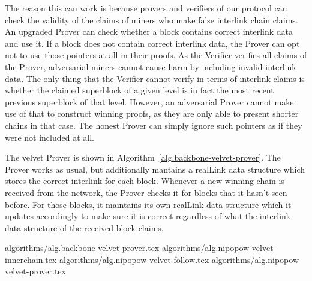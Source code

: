 The reason this can work is because provers and verifiers of our protocol can
check the validity of the claims of miners who make false interlink chain
claims. An upgraded Prover can check whether a block contains correct interlink
data and use it. If a block does not contain correct interlink data, the Prover
can opt not to use those pointers at all in their proofs. As the Verifier
verifies all claims of the Prover, adversarial miners cannot cause harm by
including invalid interlink data. The only thing that the Verifier cannot
verify in terms of interlink claims is whether the claimed superblock of a
given level is in fact the most recent previous superblock of that level.
However, an adversarial Prover cannot make use of that to construct winning
proofs, as they are only able to present shorter chains in that case. The
honest Prover can simply ignore such pointers as if they were not included at
all.

The velvet Prover is shown in Algorithm~\ref{alg.backbone-velvet-prover}. The
Prover works as usual, but additionally mantains a realLink data structure
which stores the correct interlink for each block. Whenever a new winning chain
is received from the network, the Prover checks it for blocks that it hasn't
seen before. For those blocks, it maintains its own realLink data structure
which it updates accordingly to make sure it is correct regardless of what the
interlink data structure of the received block claims.

{algorithms/alg.backbone-velvet-prover.tex}
{algorithms/alg.nipopow-velvet-innerchain.tex}
{algorithms/alg.nipopow-velvet-follow.tex}
{algorithms/alg.nipopow-velvet-prover.tex}
